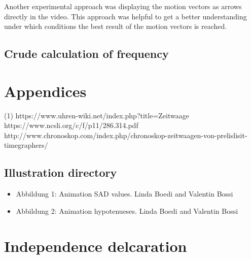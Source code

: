 \documentclass[12pt, a4paper]{report}
\begin{document}
\bigskip

Another experimental approach was displaying the motion vectors as arrows directly in the video. This approach was helpful to get a better understanding under which conditions the best result of the motion vectors is reached. 

\section{Crude calculation of frequency}
\pagebreak

\chapter{Appendices}


\begin{thebibliography}{9}
\bigskip
{} 
(1) https://www.uhren-wiki.net/index.php?title=Zeitwaage
 https://www.ncsli.org/c/f/p11/286.314.pdf
 http://www.chronoskop.com/index.php/chronoskop-zeitwaagen-von-prelislisit-timegraphers/
\end{thebibliography}

\pagebreak

\section {Illustration directory}
\bigskip

\begin{itemize}
\item Abbildung 1: Animation SAD values. Linda Boedi and Valentin Bossi
\item Abbildung 2: Animation hypotenueses. Linda Boedi and Valentin Bossi
\end{itemize}

\chapter{Independence delcaration}
\end{document}
